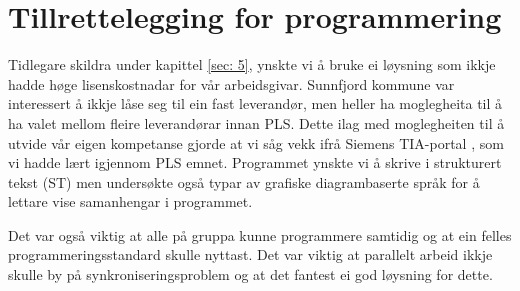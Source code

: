 \chapter{Tillrettelegging for programmering}
\thispagestyle{fancy}
\label{sec:7} 

Tidlegare skildra under kapittel \ref{sec: 5}, ynskte vi å bruke ei løysning som ikkje hadde høge lisenskostnadar for vår arbeidsgivar. 
Sunnfjord kommune var interessert å ikkje låse seg til ein fast leverandør, men heller ha moglegheita til å ha valet mellom fleire 
leverandørar innan \gls{PLS}. Dette ilag med moglegheiten til å utvide vår eigen kompetanse 
gjorde at vi såg vekk ifrå Siemens \gls{TIA}-portal \citep{Siemens}, som vi hadde lært igjennom \gls{PLS} emnet.
Programmet ynskte vi å skrive i strukturert tekst (\gls{ST}) men undersøkte også 
typar av grafiske diagrambaserte språk for å lettare vise samanhengar i programmet.

Det var også viktig at alle på gruppa kunne programmere samtidig og at ein felles programmeringsstandard skulle nyttast.
Det var viktig at parallelt arbeid ikkje skulle by på synkroniseringsproblem og at det fantest ei god løysning for dette.

